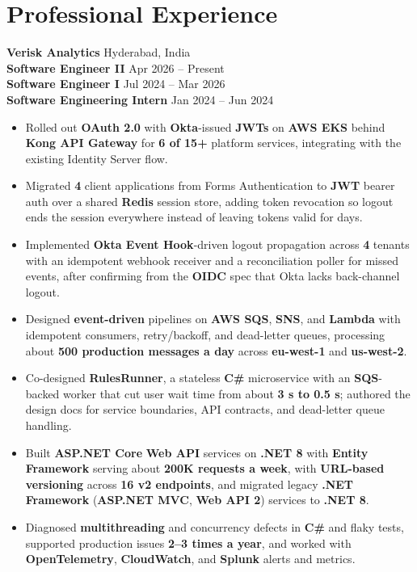 \documentclass[a4paper,10pt]{article}
\begin{document}
\section*{Professional Experience}

\textbf{Verisk Analytics} \hfill Hyderabad, India \\
\textbf{Software Engineer II} \hfill Apr 2026 -- Present \\
\textbf{Software Engineer I} \hfill Jul 2024 -- Mar 2026 \\
\textbf{Software Engineering Intern} \hfill Jan 2024 -- Jun 2024

\begin{itemize}[leftmargin=*]
    \item Rolled out \textbf{OAuth 2.0} with \textbf{Okta}-issued \textbf{JWTs} on \textbf{AWS EKS} behind \textbf{Kong API Gateway} for \textbf{6 of 15+} platform services, integrating with the existing Identity Server flow.
    \item Migrated \textbf{4} client applications from Forms Authentication to \textbf{JWT} bearer auth over a shared \textbf{Redis} session store, adding token revocation so logout ends the session everywhere instead of leaving tokens valid for days.
    \item Implemented \textbf{Okta Event Hook}-driven logout propagation across \textbf{4} tenants with an idempotent webhook receiver and a reconciliation poller for missed events, after confirming from the \textbf{OIDC} spec that Okta lacks back-channel logout.
    \item Designed \textbf{event-driven} pipelines on \textbf{AWS SQS}, \textbf{SNS}, and \textbf{Lambda} with idempotent consumers, retry/backoff, and dead-letter queues, processing about \textbf{500 production messages a day} across \textbf{eu-west-1} and \textbf{us-west-2}.
    \item Co-designed \textbf{RulesRunner}, a stateless \textbf{C\#} microservice with an \textbf{SQS}-backed worker that cut user wait time from about \textbf{3 s to 0.5 s}; authored the design docs for service boundaries, API contracts, and dead-letter queue handling.
    \item Built \textbf{ASP.NET Core} \textbf{Web API} services on \textbf{.NET 8} with \textbf{Entity Framework} serving about \textbf{200K requests a week}, with \textbf{URL-based versioning} across \textbf{16 v2 endpoints}, and migrated legacy \textbf{.NET Framework} (\textbf{ASP.NET MVC}, \textbf{Web API 2}) services to \textbf{.NET 8}.
    \item Diagnosed \textbf{multithreading} and concurrency defects in \textbf{C\#} and flaky tests, supported production issues \textbf{2--3 times a year}, and worked with \textbf{OpenTelemetry}, \textbf{CloudWatch}, and \textbf{Splunk} alerts and metrics.

\end{itemize}
\end{document}
